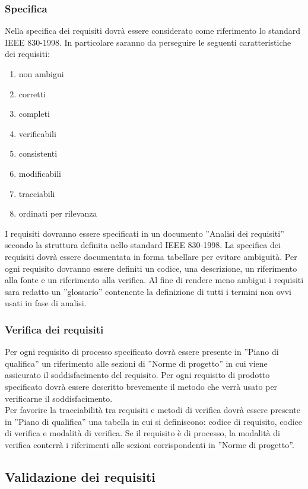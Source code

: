 {{			\subsubsection{Specifica}{
				Nella specifica dei requisiti dovr\`{a} essere considerato come riferimento lo standard IEEE 830-1998. In particolare saranno da perseguire le seguenti caratteristiche dei requisiti:
				\begin{enumerate}
					\item non ambigui
					\item corretti
					\item completi
					\item verificabili
					\item consistenti
					\item modificabili
					\item tracciabili
					\item ordinati per rilevanza
				\end{enumerate}
				I requisiti dovranno essere specificati in un documento ”Analisi dei requisiti” secondo la struttura definita nello standard IEEE 830-1998. La specifica dei requisiti dovr\`{a} essere documentata in forma tabellare per evitare ambiguit\`{a}. Per ogni requisito dovranno essere definiti un codice, una descrizione, un riferimento alla fonte e un riferimento alla verifica. Al fine di rendere meno ambigui i requisiti sara redatto un ”glossario” contenente la definizione di tutti i termini non ovvi usati in fase di analisi.
			}
			\subsubsection{Verifica dei requisiti}{
				Per ogni requisito di processo specificato dovr\`{a} essere presente in ”Piano di qualifica” un riferimento alle sezioni di ”Norme di progetto” in cui viene assicurato il soddisfacimento del requisito. Per ogni requisito di prodotto specificato dovr\`{a} essere descritto brevemente il metodo che verr\`{a} usato per verificarne il soddisfacimento.\\Per favorire la tracciabilit\`{a} tra requisiti e metodi di verifica dovr\`{a} essere presente in ”Piano di qualifica” una tabella in cui si definiscono: codice di requisito, codice di verifica e modalit\`{a} di verifica. Se il requisito \`{e} di processo, la modalit\`{a} di verifica conterr\`{a} i riferimenti alle sezioni corrispondenti in ”Norme di progetto”.
			}
		}
		\subsection{Validazione dei requisiti}{
}}

